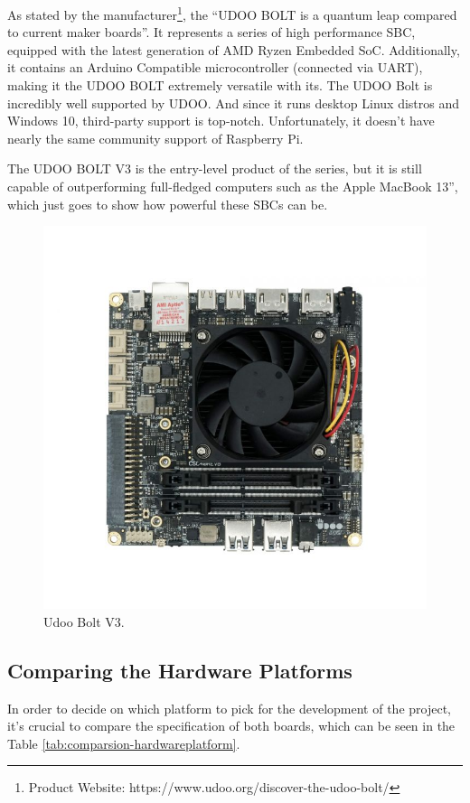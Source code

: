 As stated by the manufacturer\footnote{Product Website: https://www.udoo.org/discover-the-udoo-bolt/}, the ``UDOO BOLT is a quantum leap compared to current maker boards''. It represents a series of high performance \acs{SBC}, equipped with the latest generation of AMD Ryzen Embedded SoC. Additionally, it contains an Arduino Compatible microcontroller (connected via UART), making it the UDOO BOLT extremely versatile with its.
The UDOO Bolt is incredibly well supported by UDOO. And since it runs desktop Linux distros and Windows 10, third-party support is top-notch. Unfortunately, it doesn't have nearly the same community support of Raspberry Pi.

The UDOO BOLT V3 is the entry-level product of the series, but it is still capable of outperforming full-fledged computers such as the Apple MacBook 13'', which just goes to show how powerful these \acs{SBC}s can be.

\begin{figure}[H]
    \centering
    \includegraphics[width=0.45\linewidth]{images/udoobolt-image.jpg}
    \caption{Udoo Bolt V3.}
    \label{fig:udoobolt-image}
\end{figure}

\subsection{Comparing the Hardware Platforms}

In order to decide on which platform to pick for the development of the project, it's crucial to compare the specification of both boards, which can be seen in the Table \ref{tab:comparsion-hardwareplatform}.

